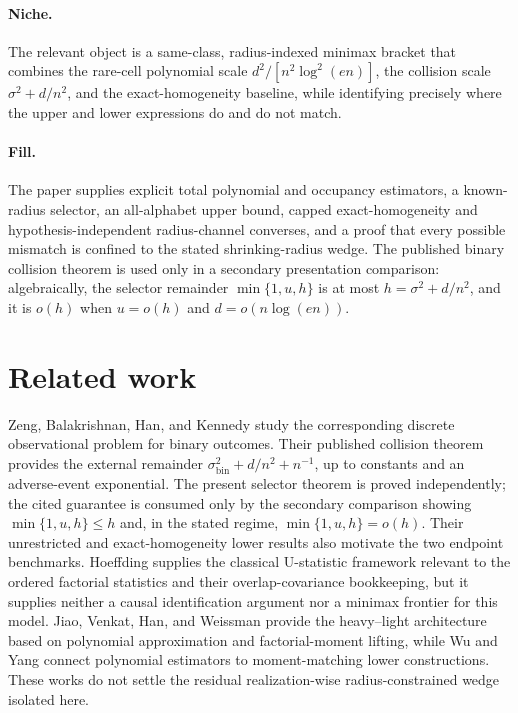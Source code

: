 \documentclass{article}
\begin{document}
\paragraph{Niche.} The relevant object is a same-class, radius-indexed minimax bracket that combines the rare-cell polynomial scale \(d^2/[n^2\log^2(en)]\), the collision scale \(\sigma^2+d/n^2\), and the exact-homogeneity baseline, while identifying precisely where the upper and lower expressions do and do not match.

\paragraph{Fill.} The paper supplies explicit total polynomial and occupancy estimators, a known-radius selector, an all-alphabet upper bound, capped exact-homogeneity and hypothesis-independent radius-channel converses, and a proof that every possible mismatch is confined to the stated shrinking-radius wedge.  The published binary collision theorem is used only in a secondary presentation comparison: algebraically, the selector remainder \(\min\{1,u,h\}\) is at most \(h=\sigma^2+d/n^2\), and it is \(o(h)\) when \(u=o(h)\) and \(d=o(n\log(en))\).

\section{Related work}

Zeng, Balakrishnan, Han, and Kennedy study the corresponding discrete observational problem for binary outcomes.  Their published collision theorem provides the external remainder \(\sigma_{\mathrm{bin}}^2+d/n^2+n^{-1}\), up to constants and an adverse-event exponential.  The present selector theorem is proved independently; the cited guarantee is consumed only by the secondary comparison showing \(\min\{1,u,h\}\le h\) and, in the stated regime, \(\min\{1,u,h\}=o(h)\).  Their unrestricted and exact-homogeneity lower results also motivate the two endpoint benchmarks.  Hoeffding supplies the classical U-statistic framework relevant to the ordered factorial statistics and their overlap-covariance bookkeeping, but it supplies neither a causal identification argument nor a minimax frontier for this model.  Jiao, Venkat, Han, and Weissman provide the heavy--light architecture based on polynomial approximation and factorial-moment lifting, while Wu and Yang connect polynomial estimators to moment-matching lower constructions.  These works do not settle the residual realization-wise radius-constrained wedge isolated here.
\end{document}
